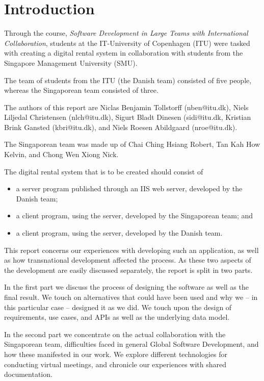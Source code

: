 \section{Introduction}

Through the course, \emph{Software Development in Large Teams with International Collaboration},
students at the IT-University of Copenhagen (ITU) were tasked with creating a digital rental
system in collaboration with students from the Singapore Management University (SMU).

The team of students from the ITU (the Danish team) consisted of five people, whereas the
Singaporean team consisted of three.

The authors of this report are Niclas Benjamin Tollstorff (nben@itu.dk), Niels Liljedal
Christensen (nlch@itu.dk), Sigurt Bladt Dinesen (sidi@itu.dk, Kristian Brink Gansted
(kbri@itu.dk), and Niels Roesen Abildgaard (nroe@itu.dk).

The Singaporean team was made up of Chai Ching Hsiang Robert, Tan Kah How Kelvin, and
Chong Wen Xiong Nick.

The digital rental system that is to be created should consist of
\begin{itemize}
    \item a server program published through an IIS web server, developed by the Danish team;
    \item a client program, using the server, developed by the Singaporean team; and
    \item a client program, using the server, developed by the Danish team.
\end{itemize}

This report concerns our experiences with developing such an application, as well as how
transnational development affected the process. As these two aspects of the development
are easily discussed separately, the report is split in two parts.

In the first part we discuss the process of designing the software as well as the final
result. We touch on alternatives that could have been used and why we – in this particular
case – designed it as we did. We touch upon the design of requirements, use cases, and APIs
as well as the underlying data model.

In the second part we concentrate on the actual collaboration with the Singaporean team,
difficulties faced in general Global Software Development, and how these manifested in
our work. We explore different technologies for conducting virtual meetings, and chronicle
our experiences with shared documentation.
